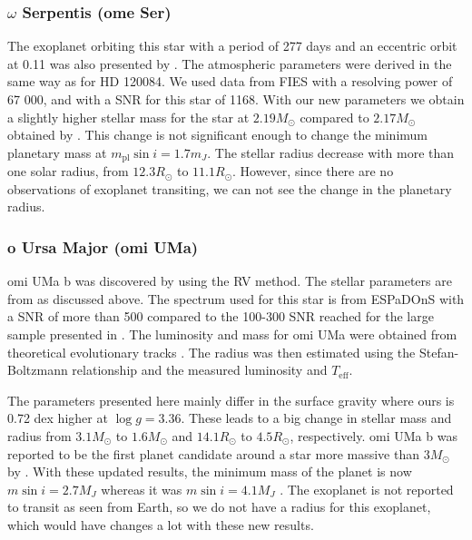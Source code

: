 \documentclass{aa}
\begin{document}
\subsubsection{$\omega$ Serpentis (ome Ser)}
\label{sub:ome_Ser}
The exoplanet orbiting this star with a period of 277 days and an eccentric
orbit at 0.11 was also presented by \citet{Sato2013}. The atmospheric parameters
were derived in the same way as for HD 120084. We used data from FIES with a
resolving power of 67 000, and with a SNR for this star of 1168. With our new
parameters we obtain a slightly higher stellar mass for the star at
$2.19M_\odot$ compared to $2.17M_\odot$ obtained by \cite{Takeda2008}. This
change is not significant enough to change the minimum planetary mass at
$m_\mathrm{pl}\sin i=1.7m_J$. The stellar radius decrease with more than one
solar radius, from $12.3R_\odot$ to $11.1R_\odot$. However, since there are no
observations of exoplanet transiting, we can not see the change in the planetary
radius.



\subsubsection{o Ursa Major (omi UMa)}
\label{sub:omiUMa}
omi UMa b was discovered by \citet{Sato2012} using the RV method. The stellar
parameters are from \citet{Takeda2008} as discussed above. The spectrum used for
this star is from ESPaDOnS with a SNR of more than 500 compared to the 100-300
SNR reached for the large sample presented in \citet{Takeda2008}. The luminosity
and mass for omi UMa were obtained from theoretical evolutionary tracks
\citep[see][and references therein]{Sato2012}. The radius was then estimated
using the Stefan-Boltzmann relationship and the measured luminosity and
$T_\mathrm{eff}$.

The parameters presented here mainly differ in the surface gravity where ours is
0.72 dex higher at $\log g=3.36$. These leads to a big change in stellar mass
and radius from $3.1M_\odot$ to $1.6M_\odot$ and $14.1R_\odot$ to $4.5R_\odot$,
respectively. omi UMa b was reported to be the first planet candidate around a
star more massive than $3M_\odot$ by \citet{Sato2012}. With these updated
results, the minimum mass of the planet is now $m\sin i=2.7M_J$ whereas it was
$m\sin i=4.1M_J$ \citep{Sato2012}. The exoplanet is not reported to transit as
seen from Earth, so we do not have a radius for this exoplanet, which would have
changes a lot with these new results.
\end{document}
